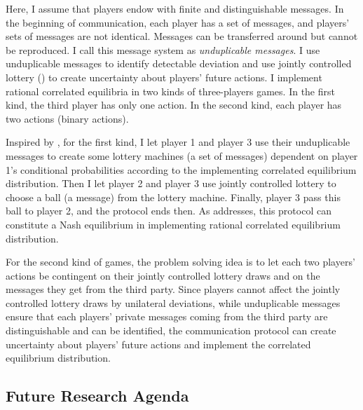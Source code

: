 \documentclass[12pt]{article}
\theoremstyle{definition}
\theoremstyle{remark}
\theoremstyle{claim}
\begin{document}
Here, I assume that players endow with finite and distinguishable messages. In the beginning of communication, each player has a set of messages, and players' sets of messages are not identical. Messages can be transferred around but cannot be reproduced. I call this message system as \textit{unduplicable messages}. I use unduplicable messages to identify detectable deviation and use jointly controlled lottery (\citep{Aumann1995}) to create uncertainty about players' future actions. I implement rational correlated equilibria in two kinds of three-players games. In the first kind, the third player has only one action. In the second kind, each player has two actions (binary actions).


Inspired by \citep{Ben-Porath1996}, for the first kind, I let player 1 and player 3 use their unduplicable messages to create some lottery machines (a set of messages) dependent on player 1's conditional probabilities according to the implementing correlated equilibrium distribution. Then I let player 2 and player 3 use jointly controlled lottery to choose a ball (a message) from the lottery machine. Finally, player 3 pass this ball to player 2, and the protocol ends then. As \citep{Ben-Porath1996} addresses, this protocol can constitute a Nash equilibrium in implementing rational correlated equilibrium distribution.

For the second kind of games, the problem solving idea is to let each two players' actions be contingent on their jointly controlled lottery draws and on the messages they get from the third party. Since players cannot affect the jointly controlled lottery draws by unilateral deviations, while unduplicable messages ensure that each players' private messages coming from the third party are distinguishable and can be identified, the communication protocol can create uncertainty about players' future actions and implement the correlated equilibrium distribution.





\subsection*{Future Research Agenda}
\end{document}
